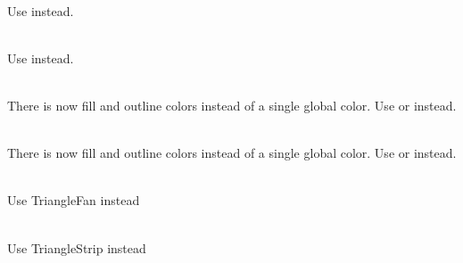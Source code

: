 \begin{DoxyRefList}
\item[Member \doxylink{classsf_1_1Shader_a7f58ab5c0a1084f238dfcec86602daa1}{sf\+::Shader\+::set\+Parameter} (const std\+::string \&name, const \doxylink{classsf_1_1Texture}{Texture} \&texture)]\hfill \\
\label{deprecated__deprecated000019}%
%
Use  instead. 
\item[Member \doxylink{classsf_1_1Shader_af06b4cba0bab915fa01032b063909044}{sf\+::Shader\+::set\+Parameter} (const std\+::string \&name, \doxylink{structsf_1_1Shader_1_1CurrentTextureType}{Current\+Texture\+Type})]\hfill \\
\label{deprecated__deprecated000020}%
%
Use  instead. 
\item[Member \doxylink{classsf_1_1Text_ab367e86c9e9e6cd3806c362ab8e79101}{sf\+::Text\+::get\+Color} () const]\hfill \\
\label{deprecated__deprecated000022}%
%
There is now fill and outline colors instead of a single global color. Use  or  instead. 
\item[Member \doxylink{classsf_1_1Text_afd1742fca1adb6b0ea98357250ffb634}{sf\+::Text\+::set\+Color} (const \doxylink{classsf_1_1Color}{Color} \&color)]\hfill \\
\label{deprecated__deprecated000021}%
%
There is now fill and outline colors instead of a single global color. Use  or  instead. 
\item[Member \doxylink{group__graphics_gga5ee56ac1339984909610713096283b1ba5338a2c6d922151fe50f235036af8a20}{sf\+::Triangles\+Fan} ]\hfill \\
\label{deprecated__deprecated000008}%
%
Use Triangle\+Fan instead  
\item[Member \doxylink{group__graphics_gga5ee56ac1339984909610713096283b1ba66643dbbb24bbacb405973ed80eebae0}{sf\+::Triangles\+Strip} ]\hfill \\
\label{deprecated__deprecated000007}%
%
Use Triangle\+Strip instead 
\end{DoxyRefList}
